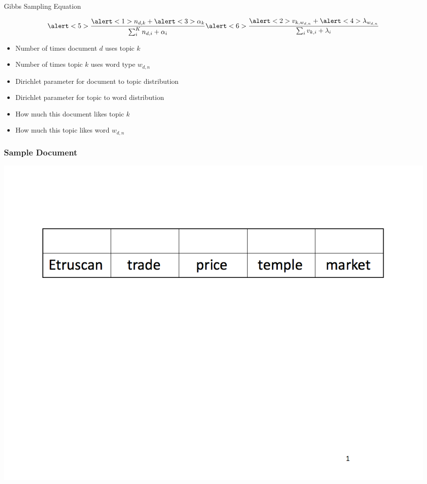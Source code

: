 \begin{frame}{Gibbs Sampling Equation}

\begin{equation}
\alert<5>{\frac{\alert<1>{n_{d, k}} +  \alert<3>{\alpha_k}}{ \sum_{i}^{K} { n_{d,i} +\alpha_i}}} \alert<6>{\frac{\alert<2>{v_{k, w_{d,n}}} + \alert<4>{\lambda_{w_{d,n}}}}{ \sum_{i} { v_{k,i} + \lambda_{i} }}}
\end{equation}

\begin{itemize}
  \item \alert<1>{Number of times document $d$ uses topic $k$}
  \item \alert<2>{Number of times topic $k$ uses word type $w_{d,n}$}
  \item \alert<3>{Dirichlet parameter for document to topic
      distribution}
  \item \alert<4>{Dirichlet parameter for topic to word distribution}
  \item \alert<5>{How much this document likes topic $k$}
  \item \alert<6>{How much this topic likes word $w_{d,n}$}
\end{itemize}

\end{frame}

\begin{frame}
  \frametitle{Sample Document}
    \includegraphics[width=\linewidth]{topic_models/mimno_001}
\end{frame}

